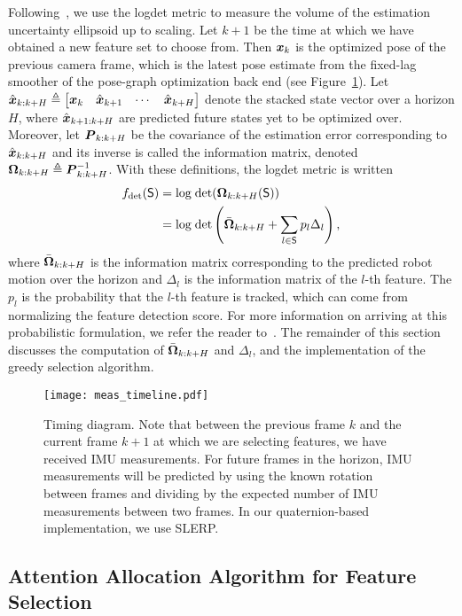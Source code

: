 Following~\cite{Carlone2017}, we use the logdet metric to measure the volume of the estimation uncertainty ellipsoid up to scaling.
Let $k+1$ be the time at which we have obtained a new feature set to choose from.
Then $\boldsymbol x_k$ is the optimized pose of the previous camera frame, which is the latest pose estimate from the fixed-lag smoother of the pose-graph optimization back end (see Figure~\ref{fig:meas_timeline}).
Let $\hat{\boldsymbol x}_{k:k+H}\triangleq\begin{bmatrix}\boldsymbol x_k&\hat{\boldsymbol x}_{k+1}&\cdots&\hat{\boldsymbol x}_{k+H}\end{bmatrix}$ denote the stacked state vector over a horizon $H$, where $\hat{\boldsymbol x}_{k+1:k+H}$ are predicted future states yet to be optimized over.
Moreover, let ${\boldsymbol P}_{k:k+H}$ be the covariance of the estimation error corresponding to $\hat{\boldsymbol x}_{k:k+H}$ and its inverse is called the information matrix, denoted ${\boldsymbol \Omega}_{k:k+H}\triangleq{\boldsymbol P}_{k:k+H}^{-1}$.
With these definitions, the logdet metric is written
\begin{align}
f_\text{det}(\mathsf{S}) &= \text{log}\;\text{det}({\boldsymbol \Omega}_{k:k+H}(\mathsf{S}))\\
&= \text{log}\;\text{det}\left(\bar{\boldsymbol \Omega}_{k:k+H} + \sum_{l\in\mathsf{S}}p_l\Delta_l\right),
\end{align}
where $\bar{\boldsymbol \Omega}_{k:k+H}$ is the information matrix corresponding to the predicted robot motion over the horizon and $\Delta_l$ is the information matrix of the $l$-th feature.
The $p_l$ is the probability that the $l$-th feature is tracked, which can come from normalizing the feature detection score.
For more information on arriving at this probabilistic formulation, we refer the reader to~\cite{Carlone2017}.
The remainder of this section discusses the computation of $\bar{\boldsymbol \Omega}_{k:k+H}$ and $\Delta_l$, and the implementation of the greedy selection algorithm.

\begin{figure}
\centering
\texttt{[image: meas\_timeline.pdf]} 
\caption{Timing diagram. Note that between the previous frame $k$ and the current frame $k+1$ at which we are selecting features, we have received IMU measurements. For future frames in the horizon, IMU measurements will be predicted by using the known rotation between frames and dividing by the expected number of IMU measurements between two frames. In our quaternion-based implementation, we use SLERP.}
\label{fig:meas_timeline} 
\end{figure}


\subsection{Attention Allocation Algorithm for Feature Selection}\label{sub:attn_algo}

